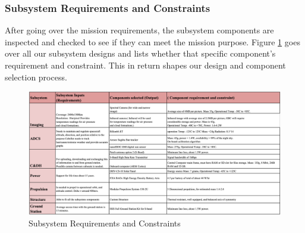 \subsubsection{Subsystem Requirements and Constraints}
After going over the mission requirements, the subsystem components are inspected and checked to see if they can meet the mission purpose.  Figure \ref{fig:ssreq} goes over all our subsystem designs and lists whether that specific component's requirement and constraint. This in return shapes our design and component selection process. \\
\FloatBarrier
\begin{figure}[hbt!]
    \centering
    \includegraphics[width=\textwidth, frame]{Images/ss_req.png}
    \caption{Subsystem Requirements and Constraints}
    \label{fig:ssreq}
\end{figure} \\

